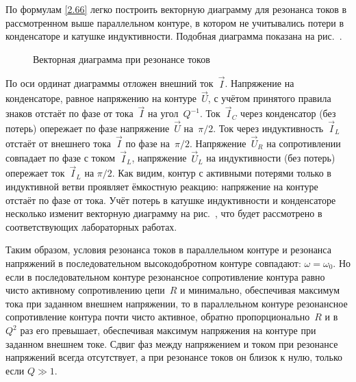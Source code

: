 По формулам \eqref{2.66} легко построить векторную диаграмму 
для резонанса токов в рассмотренном выше параллельном контуре, в котором 
не учитывались потери в конденсаторе и катушке индуктивности. 
Подобная диаграмма показана на рис.~.

\begin{figure}[h!]
	\centering
	\caption{Векторная диаграмма при резонансе токов}
\end{figure}

По оси ординат диаграммы отложен внешний ток~$\vec I$. Напряжение на конденсаторе, равное
напряжению на контуре~$\vec U$, с учётом принятого правила знаков отстаёт по
фазе от тока~$\vec I$ на угол~$Q^{-1}$. Ток~$\vec I_C$ через конденсатор (без
потерь) опережает по фазе напряжение~$\vec U$ на~$\pi/2$. Ток через
индуктивность~$\vec I_L$ отстаёт от внешнего тока~$\vec I$ по фазе на~$\pi/2$.
Напряжение~$\vec U_R$ на сопротивлении совпадает по фазе с током~$\vec I_L$,
напряжение~$\vec U_L$ на индуктивности (без потерь) опережает ток~$\vec I_L$ на
$\pi/2$. Как видим, контур с активными потерями только в индуктивной ветви
проявляет ёмкостную реакцию: напряжение на контуре отстаёт по фазе от тока. Учёт
потерь в катушке индуктивности и конденсаторе несколько изменит векторную
диаграмму на рис.~, что будет рассмотрено в соответствующих
лабораторных работах.

Таким образом, условия резонанса токов в параллельном контуре и резонанса
напряжений в последовательном высокодобротном контуре совпадают:
$\omega=\omega_0$. Но если в последовательном контуре резонансное сопротивление
контура равно чисто активному сопротивлению цепи~$R$ и минимально, обеспечивая
максимум тока при заданном внешнем напряжении, то в параллельном контуре
резонансное сопротивление контура почти чисто активное, обратно
пропорционально~$R$ и в~$Q^2$ раз его превышает, обеспечивая максимум напряжения
на контуре при заданном внешнем токе. Сдвиг фаз между напряжением и током при
резонансе напряжений всегда отсутствует, а при резонансе токов он близок к нулю,
только если $Q\gg1$.


\label{sec:ust}

